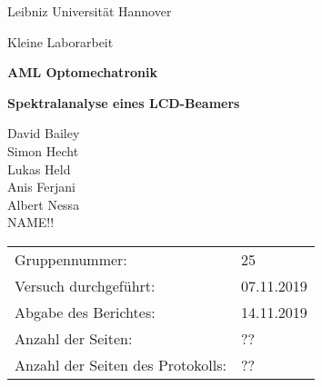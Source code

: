\begin{titlepage}
	\centering
	{Leibniz Universität Hannover\par}
	{\large Kleine Laborarbeit\par}	

	\vspace{4.5cm}	
	
	{\huge \bf AML Optomechatronik \par}
	{\Huge \bf Spektralanalyse eines LCD-Beamers\par}
	\vspace{0.3cm}
	
	\vspace{1.5cm}
	
	{\Large David Bailey 	\\
			Simon Hecht		\\
			Lukas Held		\\
			Anis Ferjani	\\
			Albert Nessa	\\
			NAME!! \par}

	\vfill

	\raggedright

{\Large
\begin{tabular}{ll}
Gruppennummer:& 25 \\
Versuch durchgeführt:& 07.11.2019 \\
Abgabe des Berichtes:& 14.11.2019 \\
Anzahl der Seiten:& ?? \\
Anzahl der Seiten des Protokolls:& ??
\end{tabular}\par}

\end{titlepage}